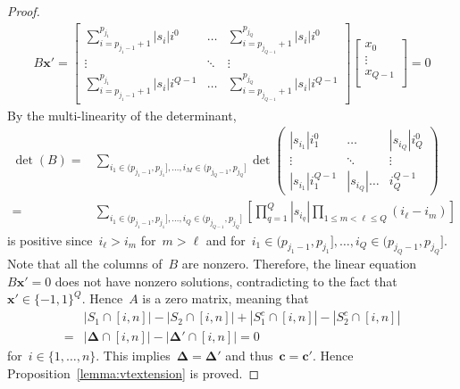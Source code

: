 \documentclass[10pt,a4paper,onecolumn]{IEEEtran}
\newtheorem{lemma}{Lemma}
\newcommand{\1}{\mathbbold{1}}
\newcommand{\boldc}{\mathbf{c}}
\begin{document}
\begin{proof}
\begin{align}\label{equation:linear}
B\boldsymbol{x}'=\begin{bmatrix}
\sum^{p_{j_1}}_{i=p_{j_1-1}+1}|s_i|i^0 &\ldots & \sum^{p_{j_Q}}_{i=p_{j_{Q-1}}+1}|s_i|i^0\\
\vdots &\ddots & \vdots\\
\sum^{p_{j_1}}_{i=p_{j_1-1}+1}|s_i|i^{Q-1} &\ldots & \sum^{p_{j_Q}}_{i=p_{j_{Q-1}}+1}|s_i|i^{Q-1}
\end{bmatrix}
\begin{bmatrix}
x_0\\
\vdots\\
x_{Q-1}\\
\end{bmatrix}
=0
\end{align}
By the multi-linearity of the determinant, 
\begin{align}
\det(B)=&\sum_{i_1\in (p_{j_1-1},p_{j_1}],\ldots,i_M\in (p_{j_Q-1},p_{j_Q}]}\det \begin{pmatrix} |s_{i_1}|i^0_1&\ldots&|s_{i_Q}|i^0_Q\\ \vdots&\ddots&\vdots\\ |s_{i_1}|i_1^{Q-1}&|s_{i_Q}|\ldots&i_Q^{Q-1} \end{pmatrix}\nonumber\\
=&\sum_{i_1\in (p_{j_1-1},p_{j_1}],\ldots,i_Q\in (p_{j_{Q-1}},p_{j_Q}]}[\prod^Q_{q=1} |s_{i_q}| \prod_{1\le m<\ell \le Q}(i_{\ell}-i_{m})]
\end{align}
is positive since~$i_{\ell}>i_{m}$ for~$m>\ell$
and for~$i_1\in (p_{j_1-1},p_{j_1}],\ldots,i_Q\in (p_{j_Q-1},p_{j_Q}]$. Note that all the columns of~$B$ are nonzero. 
Therefore, the linear equation~$B\boldsymbol{x}'=0$ does not have nonzero solutions, contradicting to the fact that~$\boldsymbol{x}'\in\{-1,1\}^Q$.
Hence~$A$ is a zero matrix, meaning that
\begin{align*}
&|S_1\cap[i,n]|-|S_2\cap[i,n]|+|S^c_1\cap[i,n]|-|S^c_2\cap[i,n]|\\
=&|\boldsymbol{\Delta}\cap [i,n]|-|\boldsymbol{\Delta}'\cap [i,n]|=0
\end{align*}
for~$i\in\{1,\ldots,n\}$. This implies~$\boldsymbol{\Delta}=\boldsymbol{\Delta}'$ and thus~$\boldc=\boldc'$. Hence Proposition~\ref{lemma:vtextension} is proved.
\end{proof}
\end{document}
